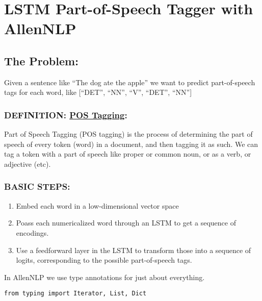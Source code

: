 \documentclass[
]{article}
\author{}
\date{}
\providecommand{\tightlist}{%
  \setlength{\itemsep}{0pt}\setlength{\parskip}{0pt}}
\begin{document}
\hypertarget{lstm-part-of-speech-tagger-with-allennlp}{%
\section{LSTM Part-of-Speech Tagger with
AllenNLP}\label{lstm-part-of-speech-tagger-with-allennlp}}

\hypertarget{the-problem}{%
\subsection{The Problem:}\label{the-problem}}

Given a sentence like ``The dog ate the apple'' we want to predict
part-of-speech tags for each word, like {[}``DET'', ``NN'', ``V'',
``DET'', ``NN''{]}

\hypertarget{definition-pos-tagging}{%
\subsubsection{\texorpdfstring{DEFINITION:
\href{https://synergo.atlassian.net/wiki/spaces/KnowRes/pages/109838612}{POS
Tagging}:}{DEFINITION: POS Tagging:}}\label{definition-pos-tagging}}

Part of Speech Tagging (POS tagging) is the process of determining the
part of speech of every token (word) in a document, and then tagging it
as such. We can tag a token with a part of speech like proper or common
noun, or as a verb, or adjective (etc).

\hypertarget{basic-steps}{%
\subsubsection{BASIC STEPS:}\label{basic-steps}}

\begin{enumerate}
\def\labelenumi{\arabic{enumi}.}
\tightlist
\item
  Embed each word in a low-dimensional vector space
\item
  Poass each numericalized word through an LSTM to get a sequence of
  encodings.
\item
  Use a feedforward layer in the LSTM to transform those into a sequence
  of logits, corresponding to the possible part-of-speech tags.
\end{enumerate}

In AllenNLP we use type annotations for just about everything.

\begin{verbatim}
from typing import Iterator, List, Dict
\end{verbatim}
\end{document}
